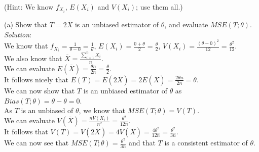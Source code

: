 \documentclass[12pt]{article}
\newcommand{\XB}{\color{black}}
\newcommand{\XBB}{\color{blue}}
\begin{document}
(Hint: We know $ f_{X_{i}} $, $ E(X_{i}) $ and $ V(X_{i}) $; use them all.)

\XBB\hrulefill\XB
\vspace{5mm}

(a) Show that $ T = 2\overline{X} $ is an unbiased estimator of $ \theta $, and evaluate $ MSE(T; \theta) $.
\vspace{2.5mm} \\
\textit{Solution}:
\vspace{2.5mm} \\

\noindent
We know that $ \displaystyle f_{X_{i}} = \frac{1}{\theta - 0} = \frac{1}{\theta} $, $ \displaystyle E(X_{i}) = \frac{0 + \theta}{2} = \frac{\theta}{2} $, $ \displaystyle V(X_{i}) = \frac{(\theta - 0)^{2}}{12} = \frac{\theta^2}{12} $. \\

\noindent
We also know that $ \displaystyle \overline{X} = \frac{\sum_{i=1}^{n} X_{i}}{n} $. \\

\noindent
We can evaluate $ \displaystyle E(\overline{X}) = \frac{\theta n}{2n} = \frac{\theta}{2} $. \\

\noindent
It follows nicely that $ \displaystyle E(T) = E(2\overline{X}) = 2E(\overline{X}) = \frac{2\theta n}{2n} = \theta $. \\

\noindent
We can now show that $ T $ is an unbiased estimator of $ \theta $ as $ Bias(T;\theta) = \theta - \theta = 0 $. \\

\noindent
As $ T $ is an unbiased of  $ \theta $, we know that $ MSE(T; \theta) = V(T) $. \\

\noindent
We can evaluate $ \displaystyle V(\overline{X}) = \frac{nV(X_{i})}{n^2} = \frac{\theta^{2}}{12n} $. \\

\noindent
It follows that $ \displaystyle V(T) = V(2\overline{X}) = 4V(\overline{X}) = \frac{4\theta^{2}}{12n} = \frac{\theta^{2}}{3n} $. \\

\noindent
We can now see that $ \displaystyle MSE(T; \theta) = \frac{\theta^{2}}{3n} $ and that $ T $ is a consistent estimator of $ \theta $. \\
\end{document}
